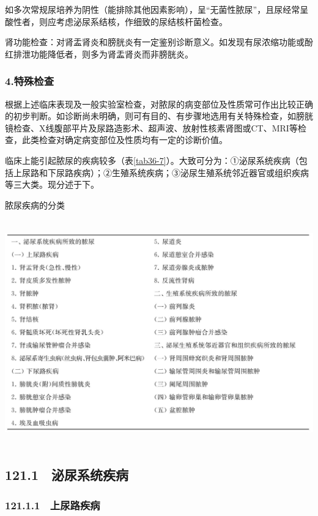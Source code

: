 如多次常规尿培养为阴性（能排除其他因素影响），呈“无菌性脓尿”，且尿经常呈酸性者，则应考虑泌尿系结核，作细致的尿结核杆菌检查。

肾功能检查：对肾盂肾炎和膀胱炎有一定鉴别诊断意义。如发现有尿浓缩功能或酚红排泄功能降低者，则多为肾盂肾炎而非膀胱炎。

\subsubsection{4.特殊检查}

根据上述临床表现及一般实验室检查，对脓尿的病变部位及性质常可作出比较正确的初步判断。如诊断尚未明确，则可有目的、有步骤地选用有关特殊检查，如膀胱镜检查、X线腹部平片及尿路造影术、超声波、放射性核素肾图或CT、MRI等检查，此类检查对确定病变部位及性质均有一定的诊断价值。

临床上能引起脓尿的疾病较多（表\ref{tab36-7}）。大致可分为：①泌尿系统疾病（包括上尿路和下尿路疾病）；②生殖系统疾病；③泌尿生殖系统邻近器官或组织疾病等三大类。现分述于下。

\begin{table}[htbp]
\centering
\caption{脓尿疾病的分类}
\label{tab36-7}
\includegraphics[width=5.94792in,height=3.84375in]{./images/Image00230.jpg}
\end{table}

\protect\hypertarget{text00283.html}{}{}

\subsection{121.1　泌尿系统疾病}

\subsubsection{121.1.1　上尿路疾病}

